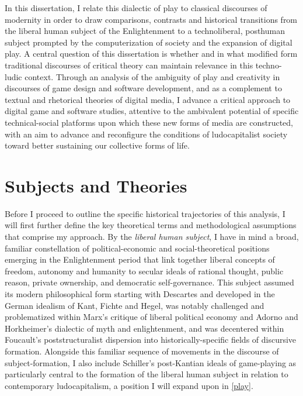 In this dissertation, I relate this dialectic of play to classical discourses of modernity in order to draw comparisons, contrasts and historical transitions from the liberal human subject of the Enlightenment to a technoliberal, posthuman subject prompted by the computerization of society and the expansion of digital play. A central question of this dissertation is whether and in what modified form traditional discourses of critical theory can maintain relevance in this techno-ludic context. Through an analysis of the ambiguity of play and creativity in discourses of game design and software development, and as a complement to textual and rhetorical theories of digital media, I advance a critical approach to digital game and software studies, attentive to the ambivalent potential of specific technical-social platforms upon which these new forms of media are constructed, with an aim to advance and reconfigure the conditions of ludocapitalist society toward better sustaining our collective forms of life.

\section*{Subjects and Theories}
Before I proceed to outline the specific historical trajectories of this
analysis, I will first further define the key theoretical terms and
methodological assumptions that comprise my approach. By the \emph{liberal human
subject}, I have in mind a broad, familiar constellation of political-economic
and social-theoretical positions emerging in the Enlightenment period that link
together liberal concepts of freedom, autonomy and humanity to secular ideals of
rational thought, public reason, private ownership, and democratic
self-governance. This subject assumed its modern philosophical form starting
with Descartes and developed in the German idealism of Kant, Fichte and Hegel,
was notably challenged and problematized within Marx's critique of liberal
political economy and Adorno and Horkheimer's dialectic of myth and
enlightenment, and was decentered within Foucault's poststructuralist dispersion
into historically-specific fields of discursive formation. Alongside this
familiar sequence of movements in the discourse of subject-formation, I also
include Schiller's post-Kantian ideals of game-playing as particularly central
to the formation of the liberal human subject in relation to contemporary
ludocapitalism, a position I will expand upon in \cref{play}.

